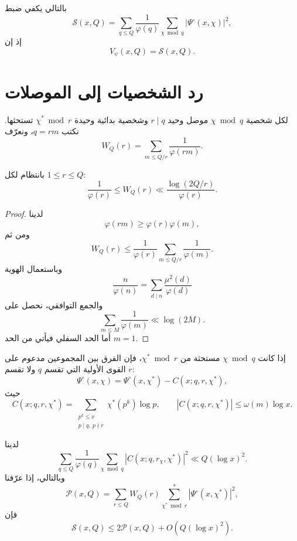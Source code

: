بالتالي يكفي ضبط
\[
\mathcal S(x,Q)
=
\sum_{q\le Q}\frac1{\varphi(q)}
\sum_{\chi\bmod q}|\Psi^\circ(x,\chi)|^2,
\]
إذ إن
\[
V_\psi(x,Q)=\mathcal S(x,Q).
\tag{14.2}
\]

\section{رد الشخصيات إلى الموصلات}

لكل شخصية \(\chi\bmod q\) موصل وحيد \(r\mid q\) وشخصية بدائية وحيدة
\(\chi^*\bmod r\) تستحثها. نكتب \(q=rm\)، ونعرّف
\[
W_Q(r)=\sum_{m\le Q/r}\frac1{\varphi(rm)}.
\]

\begin{lemma}
\label{lem:chapter14-conductor-weight}
\provedhere
بانتظام لكل \(1\le r\le Q\):
\[
\frac1{\varphi(r)}
\le W_Q(r)
\ll
\frac{\log(2Q/r)}{\varphi(r)}.
\tag{14.3}
\]
\end{lemma}

\begin{proof}
لدينا
\[
\varphi(rm)\ge\varphi(r)\varphi(m),
\]
ومن ثم
\[
W_Q(r)
\le
\frac1{\varphi(r)}
\sum_{m\le Q/r}\frac1{\varphi(m)}.
\]
وباستعمال الهوية
\[
\frac{n}{\varphi(n)}
=
\sum_{d\mid n}\frac{\mu^2(d)}{\varphi(d)}
\]
والجمع التوافقي، نحصل على
\[
\sum_{m\le M}\frac1{\varphi(m)}\ll\log(2M).
\]
أما الحد السفلي فيأتي من الحد \(m=1\).
\end{proof}

إذا كانت \(\chi\bmod q\) مستحثة من \(\chi^*\bmod r\)، فإن الفرق بين
المجموعين مدعوم على القوى الأولية التي تقسم \(q\) ولا تقسم \(r\):
\[
\Psi^\circ(x,\chi)
=
\Psi^\circ(x,\chi^*)-C(x;q,r,\chi^*),
\]
حيث
\[
C(x;q,r,\chi^*)
=
\sum_{\substack{p^k\le x\\p\mid q,\ p\nmid r}}
\chi^*(p^k)\log p,
\qquad
|C(x;q,r,\chi^*)|\le\omega(m)\log x.
\tag{14.4}
\]

\begin{lemma}
\label{lem:chapter14-local-corrections}
\provedhere
لدينا
\[
\sum_{q\le Q}\frac1{\varphi(q)}
\sum_{\chi\bmod q}|C(x;q,r_\chi,\chi^*)|^2
\ll Q(\log x)^2.
\tag{14.5}
\]
وبالتالي، إذا عرّفنا
\[
\mathcal P(x,Q)
=
\sum_{r\le Q}W_Q(r)
\sum_{\chi^*\bmod r}^{*}|\Psi^\circ(x,\chi^*)|^2,
\]
فإن
\[
\mathcal S(x,Q)
\le2\mathcal P(x,Q)+O\!\left(Q(\log x)^2\right).
\tag{14.6}
\]
\end{lemma}

